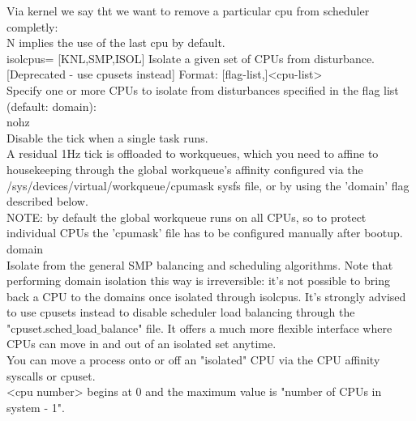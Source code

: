 \documentclass[11pt, a4paper, oneside]{article}
\theoremstyle{definition}
\begin{document}
Via kernel we say tht we want to remove a particular cpu from scheduler completly:\\
N implies the use of the last cpu by default.\\
isolcpus=       [KNL,SMP,ISOL] Isolate a given set of CPUs from disturbance.
                        [Deprecated - use cpusets instead]
                        Format: [flag-list,]<cpu-list>\\

                        Specify one or more CPUs to isolate from disturbances
                        specified in the flag list (default: domain):\\

                        nohz\\
                          Disable the tick when a single task runs.\\

                          A residual 1Hz tick is offloaded to workqueues, which you
                          need to affine to housekeeping through the global
                          workqueue's affinity configured via the
                          /sys/devices/virtual/workqueue/cpumask sysfs file, or
                          by using the 'domain' flag described below.\\

                          NOTE: by default the global workqueue runs on all CPUs,
                          so to protect individual CPUs the 'cpumask' file has to
                          be configured manually after bootup.\\

                        domain\\
                          Isolate from the general SMP balancing and scheduling
                          algorithms. Note that performing domain isolation this way
                          is irreversible: it's not possible to bring back a CPU to
                          the domains once isolated through isolcpus. It's strongly
                          advised to use cpusets instead to disable scheduler load
                          balancing through the "cpuset.sched$\_$load$\_$balance" file.
                          It offers a much more flexible interface where CPUs can
                          move in and out of an isolated set anytime.\\

                          You can move a process onto or off an "isolated" CPU via
                          the CPU affinity syscalls or cpuset.\\
                          <cpu number> begins at 0 and the maximum value is
                          "number of CPUs in system - 1".\\
\end{document}
